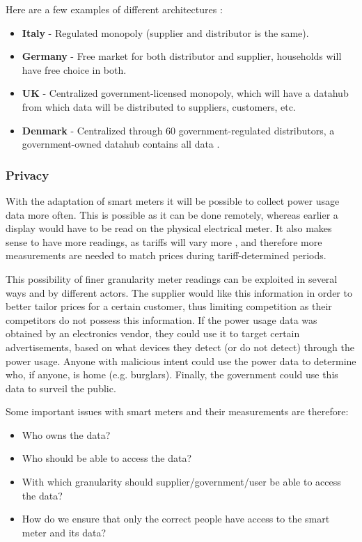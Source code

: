 Here are a few examples of different architectures \cite{smart_meter_survey}:
\begin{itemize}
	\item \textbf{Italy} - Regulated monopoly (supplier and distributor is the same).
	\item \textbf{Germany} - Free market for both distributor and supplier, households will have free choice in both.
	\item \textbf{UK} - Centralized government-licensed monopoly, which will have a datahub from which data will be distributed to suppliers, customers, etc.
	\item \textbf{Denmark} - Centralized through 60 government-regulated distributors, a government-owned datahub contains all data \cite{dk_marked,LOV_nr_575_af_18-06-2012}.
\end{itemize}

\subsubsection{Privacy}
With the adaptation of smart meters it will be possible to collect power usage data more often.
This is possible as it can be done remotely, whereas earlier a display would have to be read on the physical electrical meter.
It also makes sense to have more readings, as tariffs will vary more \cite{directive_2009_72_EC, eu_smart_meter_pricing}, and therefore more measurements are needed to match prices during tariff-determined periods.

This possibility of finer granularity meter readings can be exploited in several ways and by different actors.
The supplier would like this information in order to better tailor prices for a certain customer, thus limiting competition as their competitors do not possess this information.
If the power usage data was obtained by an electronics vendor, they could use it to target certain advertisements, based on what devices they detect (or do not detect) through the power usage.
Anyone with malicious intent could use the power data to determine who, if anyone, is home (e.g. burglars).
Finally, the government could use this data to surveil the public.

Some important issues with smart meters and their measurements are therefore:
\begin{itemize}
	\item Who owns the data?
	\item Who should be able to access the data?
	\item With which granularity should supplier/government/user be able to access the data?
	\item How do we ensure that only the correct people have access to the smart meter and its data?
\end{itemize}

